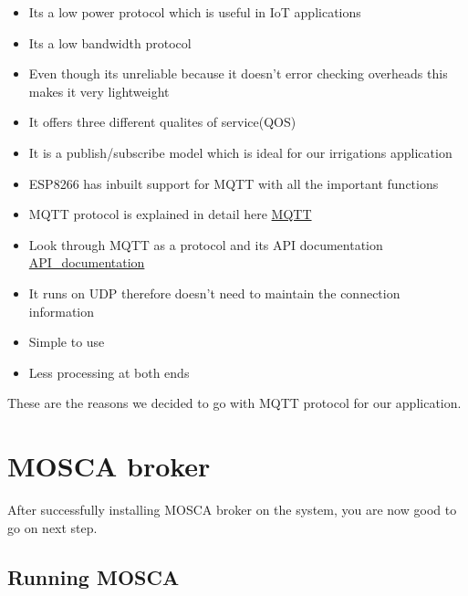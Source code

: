 \documentclass[16pt]{article}
\begin{document}
\begin{itemize}

\item
  Its a low power protocol which is useful in IoT applications
\item
  Its a low bandwidth protocol
\item
  Even though its unreliable because it doesn't error checking overheads
  this makes it very lightweight
\item
  It offers three different qualites of service(QOS)
\item
  It is a publish/subscribe model which is ideal for our irrigations
  application
\item
  ESP8266 has inbuilt support for MQTT with all the important functions
\item
  MQTT protocol is explained in detail here
  \href{http://mosquitto.org/man/mqtt-7.html}{MQTT}
\item
  Look through MQTT as a protocol and its API documentation
  \href{http://knolleary.net/arduino-client-for-mqtt/api/}{API\_documentation}
\item
  It runs on UDP therefore doesn't need to maintain the connection
  information
\item
  Simple to use
\item
  Less processing at both ends
\end{itemize}

These are the reasons we decided to go with MQTT protocol for our
application.

\vspace{13cm}

\section{MOSCA broker}

\vspace{0.5cm}

After successfully installing MOSCA broker on the system, you are now
good to go on next step.

\vspace{0.5cm}
\subsection{Running MOSCA}

\vspace{0.3cm}

\end{document}
